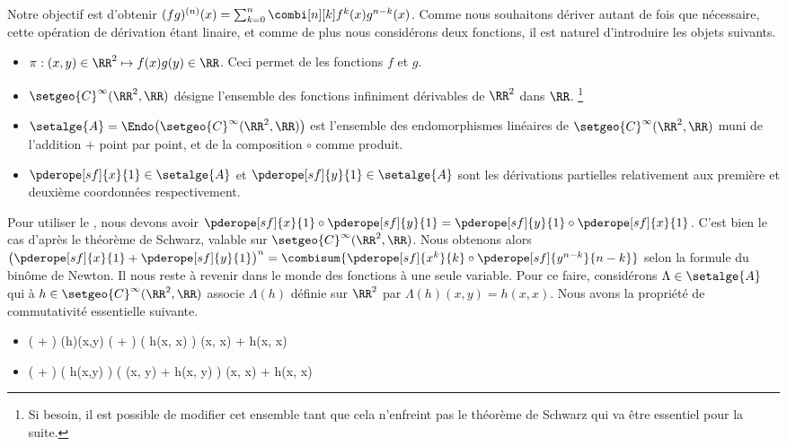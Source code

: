 Notre objectif est d'obtenir
$(fg)^{(n)} (x) = \sum_{k=0}^n \combi[n][k] f^k(x) g^{n-k}(x)$.
%
Comme nous souhaitons dériver autant de fois que nécessaire, cette opération de dérivation étant linaire,
et
comme de plus nous considérons deux fonctions,
il est naturel d'introduire les objets suivants.
%
\begin{itemize}
    \item $\pi: (x,y) \in \RR^2 \mapsto f(x) g(y) \in \RR$. Ceci permet de  les fonctions $f$ et $g$.

    \item $\setgeo{C}^{\infty}(\RR^2 , \RR)$ désigne l'ensemble des fonctions infiniment dérivables de $\RR^2$ dans $\RR$.%
    \footnote{
        Si besoin, il est possible de modifier cet ensemble tant que cela n'enfreint pas le théorème de Schwarz qui va être essentiel pour la suite.
    }

    \item $\setalge{A} = \Endo \big( \setgeo{C}^{\infty}(\RR^2 , \RR) \big)$ est l'ensemble des endomorphismes linéaires de $\setgeo{C}^{\infty}(\RR^2 , \RR)$ muni de l'addition $+$ point par point, et de la composition $\circ$ comme produit.

    \item $\pderope[sf]{x}{1} \in \setalge{A}$ et $\pderope[sf]{y}{1} \in \setalge{A}$ sont les dérivations partielles relativement aux première et deuxième coordonnées respectivement.
\end{itemize}


Pour utiliser le , nous devons avoir $\pderope[sf]{x}{1} \circ \pderope[sf]{y}{1} = \pderope[sf]{y}{1} \circ \pderope[sf]{x}{1}$. C'est bien le cas d'après le théorème de Schwarz, valable sur $\setgeo{C}^{\infty}(\RR^2 , \RR)$.
%
Nous obtenons alors
$\big( \pderope[sf]{x}{1} + \pderope[sf]{y}{1} \big)^n = \combisum{ \pderope[sf]{x^k}{k} \circ \pderope[sf]{y^{n-k}}{n-k}}$
selon la formule du binôme de Newton.
%
Il nous reste à revenir dans le monde des fonctions à une seule variable. Pour ce faire, considérons $\Lambda \in \setalge{A}$ qui à $h \in \setgeo{C}^{\infty}(\RR^2 , \RR)$ associe $\Lambda(h)$ définie sur $\RR^2$ par $\Lambda(h)(x,y) = h(x, x)$.
%
Nous avons la propriété de commutativité essentielle suivante.
%
\begin{itemize}
    \item
    \begin{stepcalc}[style=sar]
        \big(  +  \big) \circ \Lambda(h)(x,y)
    \explnext{}
        \big(  +  \big) \big( h(x, x) \big)
    \explnext{}
        (x, x) + h(x, x)
    \end{stepcalc}


    \item
    \begin{stepcalc}[style=sar]
        \Lambda \circ \big(  +  \big) \big( h(x,y) \big)
    \explnext{}
        \Lambda \big( (x, y) + h(x, y) \big)
    \explnext{}
        (x, x) + h(x, x)
    \end{stepcalc}
\end{itemize}



